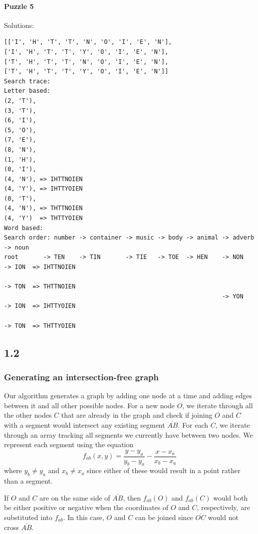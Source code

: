 \paragraph{Puzzle 5}
Solutions:\\
\begin{verbatim}
[['I', 'H', 'T', 'T', 'N', 'O', 'I', 'E', 'N'],
['I', 'H', 'T', 'T', 'Y', 'O', 'I', 'E', 'N'],
['T', 'H', 'T', 'T', 'N', 'O', 'I', 'E', 'N'],
['T', 'H', 'T', 'T', 'Y', 'O', 'I', 'E', 'N']]
Search trace:
Letter based:
(2, 'T'),
(3, 'T'),
(6, 'I'),
(5, 'O'),
(7, 'E'),
(8, 'N'),
(1, 'H'),
(0, 'I'),
(4, 'N'), => IHTTNOIEN
(4, 'Y'), => IHTTYOIEN
(0, 'T'),
(4, 'N'), => THTTNOIEN
(4, 'Y')  => THTTYOIEN
Word based:
Search order: number -> container -> music -> body -> animal -> adverb -> noun
root       -> TEN    -> TIN       -> TIE   -> TOE  -> HEN    -> NON    -> ION  => IHTTNOIEN
                                                                       -> TON  => THTTNOIEN
                                                             -> YON    -> ION  => IHTTYOIEN
                                                                       -> TON  => THTTYOIEN
\end{verbatim}
\subsection*{1.2}
\subsubsection*{Generating an intersection-free graph}
Our algorithm generates a graph by adding one node at a time and adding edges between it and all other possible nodes. For a new node $O$, we iterate through all the other nodes $C$ that are already in the graph and check if joining $O$ and $C$ with a segment would intersect any existing segment $\overline{AB}$. For each $C$, we iterate through an array tracking all segments we currently have between two nodes. We represent each segment using the equation
\begin{equation}
  f_{ab}(x,y) = \frac{y-y_a}{y_b-y_a} - \frac{x-x_a}{x_b-x_a}
\end{equation}
where $y_b \ne y_a$ and $x_b \ne x_a$ since either of these would result in a point rather than a segment.

If $O$ and $C$ are on the same side of $\overline{AB}$, then $f_{ab}(O)$ and $f_{ab}(C)$ would both be either positive or negative when the coordinates of $O$ and $C$, respectively, are substituted into $f_{ab}$. In this case, $O$ and $C$ can be joined since $\overline{OC}$ would not cross $\overline{AB}$.


